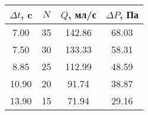 \begin{tabular}{c|c|c|c}
\toprule
$\Delta t$, c & $N$ & $Q$, мл/с & $\Delta P$, Па \\
\midrule
7.00 & 35 & 142.86 & 68.03 \\
7.50 & 30 & 133.33 & 58.31 \\
8.85 & 25 & 112.99 & 48.59 \\
10.90 & 20 & 91.74 & 38.87 \\
13.90 & 15 & 71.94 & 29.16 \\
\bottomrule
\end{tabular}

